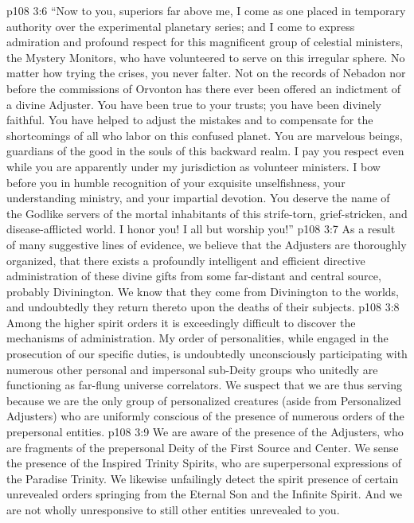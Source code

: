 \vs p108 3:6 “Now to you, superiors far above me, I come as one placed in temporary authority over the experimental planetary series; and I come to express admiration and profound respect for this magnificent group of celestial ministers, the Mystery Monitors, who have volunteered to serve on this irregular sphere. No matter how trying the crises, you never falter. Not on the records of Nebadon nor before the commissions of Orvonton has there ever been offered an indictment of a divine Adjuster. You have been true to your trusts; you have been divinely faithful. You have helped to adjust the mistakes and to compensate for the shortcomings of all who labor on this confused planet. You are marvelous beings, guardians of the good in the souls of this backward realm. I pay you respect even while you are apparently under my jurisdiction as volunteer ministers. I bow before you in humble recognition of your exquisite unselfishness, your understanding ministry, and your impartial devotion. You deserve the name of the Godlike servers of the mortal inhabitants of this strife\hyp{}torn, grief\hyp{}stricken, and disease\hyp{}afflicted world. I honor you! I all but worship you!”
\pc \vs p108 3:7 As a result of many suggestive lines of evidence, we believe that the Adjusters are thoroughly organized, that there exists a profoundly intelligent and efficient directive administration of these divine gifts from some far\hyp{}distant and central source, probably Divinington. We know that they come from Divinington to the worlds, and undoubtedly they return thereto upon the deaths of their subjects.
\vs p108 3:8 Among the higher spirit orders it is exceedingly difficult to discover the mechanisms of administration. My order of personalities, while engaged in the prosecution of our specific duties, is undoubtedly unconsciously participating with numerous other personal and impersonal sub\hyp{}Deity groups who unitedly are functioning as far\hyp{}flung universe correlators. We suspect that we are thus serving because we are the only group of personalized creatures (aside from Personalized Adjusters) who are uniformly conscious of the presence of numerous orders of the prepersonal entities.
\vs p108 3:9 We are aware of the presence of the Adjusters, who are fragments of the prepersonal Deity of the First Source and Center. We sense the presence of the Inspired Trinity Spirits, who are superpersonal expressions of the Paradise Trinity. We likewise unfailingly detect the spirit presence of certain unrevealed orders springing from the Eternal Son and the Infinite Spirit. And we are not wholly unresponsive to still other entities unrevealed to you.
